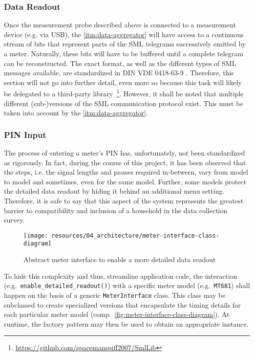 \subsubsection{Data Readout}
\label{sec:meter-data-readout}

Once the measurement probe described above is connected to a measurement device (e.g. via USB), the \ref{itm:data-aggregator} will have access to a continuous stream of bits that represent parts of the \acs{SML} telegrams successively emitted by a meter. Naturally, these bits will have to be buffered until a complete telegram can be reconstructed. The exact format, as well as the different types of \acs{SML} messages available, are standardized in \acs{DIN} \acs{VDE} 0418-63-9 \cite{vde2018sml}. Therefore, this section will not go into further detail, even more so because this task will likely be delegated to a third-party library~\footnote{\url{https://github.com/spacemanspiff2007/SmlLib}}. However, it shall be noted that multiple different (sub-)versions of the \acs{SML} communication protocol exist. This must be taken into account by the \ref{itm:data-aggregator}.


\subsubsection{\acs*{PIN} Input}
\label{sec:meter-pin-input}

The process of entering a meter's \acs{PIN} has, unfortunately, not been standardized as rigorously. In fact, during the course of this project, it has been observed that the steps, i.e. the signal lengths and pauses required in-between, vary from model to model and sometimes, even for the same model. Further, some models protect the detailed data readout by hiding it behind an additional menu setting. Therefore, it is safe to say that this aspect of the system represents the greatest barrier to compatibility and inclusion of a household in the data collection survey.

\begin{figure}[hbt]
  \centering
  \texttt{[image: resources/04\_architecture/meter-interface-class-diagram]}
  \caption{Abstract meter interface to enable a more detailed data readout}
  \label{fig:meter-interface-class-diagram}
\end{figure}

\FloatBarrier

To hide this complexity and thus, streamline application code, the interaction (e.g.~\texttt{enable\_detailed\_readout()}) with a specific meter model (e.g.~\texttt{MT681}) shall happen on the basis of a generic \texttt{MeterInterface} class. This class may be subclassed to create specialized versions that encapsulate the timing details for each particular meter model (comp.~\autoref{fig:meter-interface-class-diagram}). At runtime, the factory pattern may then be used to obtain an appropriate instance.


